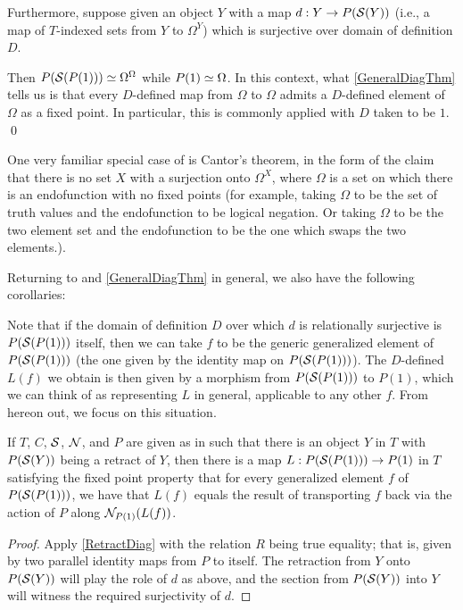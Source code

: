 Furthermore, suppose given an object $Y$ with a map $d : Y \to P(\mathcal{S}(Y))$ (i.e., a map of $T$-indexed sets from $Y$ to $\Omega^Y$) which is surjective over domain of definition $D$.

Then $P(\mathcal{S}(P(1))) \simeq \Omega^{\Omega}$ while $P(1) \simeq \Omega$. In this context, what \cref{GeneralDiagThm} tells us is that every $D$-defined map from $\Omega$ to $\Omega$ admits a $D$-defined element of $\Omega$ as a fixed point. In particular, this is commonly applied with $D$ taken to be $1$. \qed
{}

\label{CantorsTheorem}
One very familiar special case of  is Cantor's theorem, in the form of the claim that there is no set $X$ with a surjection onto $\Omega^X$, where $\Omega$ is a set on which there is an endofunction with no fixed points (for example, taking $\Omega$ to be the set of truth values and the endofunction to be logical negation. Or taking $\Omega$ to be the two element set and the endofunction to be the one which swaps the two elements.).

Returning to  and \cref{GeneralDiagThm} in general, we also have the following corollaries:

\begin{corollary}\label{RetractDiag}
Note that if the domain of definition $D$ over which $d$ is relationally surjective is $P(\mathcal{S}(P(1)))$ itself, then we can take $f$ to be the generic generalized element of $P(\mathcal{S}(P(1)))$ (the one given by the identity map on $P(\mathcal{S}(P(1)))$). The $D$-defined $L(f)$ we obtain is then given by a morphism from $P(\mathcal{S}(P(1)))$ to $P(1)$, which we can think of as representing $L$ in general, applicable to any other $f$. From hereon out, we focus on this situation.
\end{corollary}

\begin{corollary}\label{RetractInT}
If $T$, $C$, $\mathcal{S}$, $\mathcal{N}$, and $P$ are given as in  such that there is an object $Y$ in $T$ with $P(\mathcal{S}(Y))$ being a retract of $Y$, then there is a map $L : P(\mathcal{S}(P(1))) \to P(1)$ in $T$ satisfying the fixed point property that for every generalized element $f$ of $P(\mathcal{S}(P(1)))$, we have that $L(f)$ equals the result of transporting $f$ back via the action of $P$ along $\mathcal{N}_{P(1)}(L(f))$.
\end{corollary}
\begin{proof}
Apply \cref{RetractDiag} with the relation $R$ being true equality; that is, given by two parallel identity maps from $P$ to itself. The retraction from $Y$ onto $P(\mathcal{S}(Y))$ will play the role of $d$ as above, and the section from $P(\mathcal{S}(Y))$ into $Y$ will witness the required surjectivity of $d$.
\end{proof}

